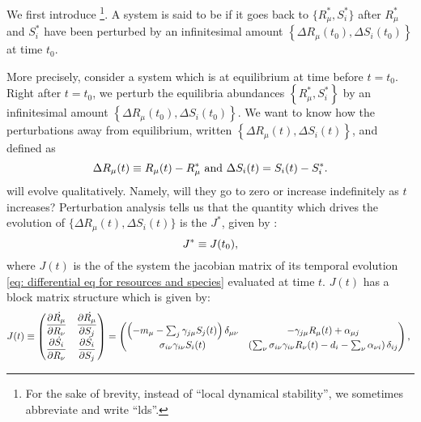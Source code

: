 \documentclass[12pt, titlepage]{report}
\begin{document}
We first introduce \footnote{For the sake of brevity, instead of ``local dynamical stability'', we sometimes abbreviate and write ``lds''.}. A system is said to be  if it goes back to  $\{ R^*_\mu, S^*_i \} $ after $R^*_\mu$ and $S^*_i$ have been perturbed by an infinitesimal amount $\left\{ \Delta R_\mu(t_0), \Delta S_i(t_0) \right\}$ at time $t_0$.

More precisely, consider a system which is at equilibrium at time before $t=t_0$. Right after $t=t_0$, we perturb the equilibria abundances $\left\{R_\mu^*, S_i^*\right\}$ by an infinitesimal amount $\left\{ \Delta R_\mu(t_0), \Delta S_i(t_0) \right\}$.
We want to know how the perturbations away from equilibrium, written $\left\{ \Delta R_\mu(t), \Delta S_i(t) \right\}$, and defined as
\begin{equation}
\Delta R_\mu(t)\equiv R_\mu(t)-R_\mu^* \text{ and } \Delta S_i(t) = S_i(t)-S_i^*.
\end{equation}
will evolve qualitatively. Namely, will they go to zero or increase indefinitely as $t$ increases? Perturbation analysis tells us \cite{strogatz_nonlinear_1994} that the quantity which drives the evolution of $\{ \Delta R_\mu(t), \Delta S_i(t)\}$
is the  $J^*$, given by :
\begin{equation}
J^* \equiv J(t_0),
\end{equation}
where $J(t)$ is the  of the system \ie the jacobian matrix of its temporal evolution \eqref{eq: differential eq for resources and species} evaluated at time $t$. $J(t)$ has a block matrix structure which is given by:
\begin{equation}
  J(t) \defined
\begin{pmatrix}
  \partiald{\dot{R_\mu}}{R_\nu}& \partiald{\dot{R_\mu}}{S_j} \\
  \partiald{\dot{S_i}}{R_\nu} & \partiald{\dot{S_i}}{S_j}
\end{pmatrix}
=
\begin{pmatrix}
  \left(-m_\mu-\sum_j \gamma_{j\mu}S_j(t)\right)\delta_{\mu\nu} & -\gamma_{j\mu}R_\mu(t)+\alpha_{\mu j} \\
  \sigma_{i\nu}\gamma_{i\nu}S_i(t) &\left(\sum_{\nu} \sigma_{i\nu}\gamma_{i\nu}R_\nu(t)-d_i-\sum_\nu \alpha_{\nu i}\right)\delta_{ij}
\end{pmatrix}, \label{eq: definition of jacobian}
\end{equation}
\end{document}
